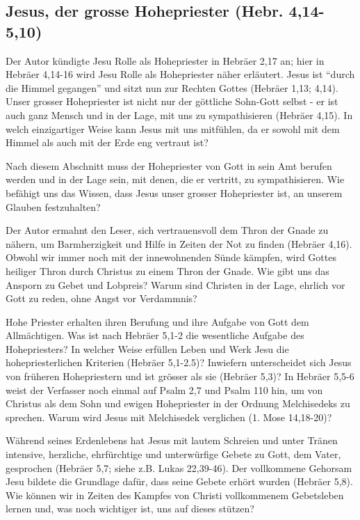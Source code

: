 \documentclass[
  12pt,
]{krantz}
\begin{document}
\hypertarget{jesus-der-grosse-hohepriester-hebr.-414-510}{%
\subsection{Jesus, der grosse Hohepriester (Hebr. 4,14-5,10)}\label{jesus-der-grosse-hohepriester-hebr.-414-510}}

Der Autor kündigte Jesu Rolle als Hohepriester in Hebräer 2,17 an; hier in Hebräer 4,14-16 wird Jesu Rolle als Hohepriester näher erläutert. Jesus ist ``durch die Himmel gegangen'' und sitzt nun zur Rechten Gottes (Hebräer 1,13; 4,14). Unser grosser Hohepriester ist nicht nur der göttliche Sohn-Gott selbst - er ist auch ganz Mensch und in der Lage, mit uns zu sympathisieren (Hebräer 4,15). In welch einzigartiger Weise kann Jesus mit uns mitfühlen, da er sowohl mit dem Himmel als auch mit der Erde eng vertraut ist?

Nach diesem Abschnitt muss der Hohepriester von Gott in sein Amt berufen werden und in der Lage sein, mit denen, die er vertritt, zu sympathisieren. Wie befähigt uns das Wissen, dass Jesus unser grosser Hohepriester ist, an unserem Glauben festzuhalten?

Der Autor ermahnt den Leser, sich vertrauensvoll dem Thron der Gnade zu nähern, um Barmherzigkeit und Hilfe in Zeiten der Not zu finden (Hebräer 4,16). Obwohl wir immer noch mit der innewohnenden Sünde kämpfen, wird Gottes heiliger Thron durch Christus zu einem Thron der Gnade. Wie gibt uns das Ansporn zu Gebet und Lobpreis? Warum sind Christen in der Lage, ehrlich vor Gott zu reden, ohne Angst vor Verdammnis?

Hohe Priester erhalten ihren Berufung und ihre Aufgabe von Gott dem Allmächtigen. Was ist nach Hebräer 5,1-2 die wesentliche Aufgabe des Hohepriesters? In welcher Weise erfüllen Leben und Werk Jesu die hohepriesterlichen Kriterien (Hebräer 5,1-2.5)? Inwiefern unterscheidet sich Jesus von früheren Hohepriestern und ist grösser als sie (Hebräer 5,3)?
In Hebräer 5,5-6 weist der Verfasser noch einmal auf Psalm 2,7 und Psalm 110 hin, um von Christus als dem Sohn und ewigen Hohepriester in der Ordnung Melchisedeks zu sprechen. Warum wird Jesus mit Melchisedek verglichen (1. Mose 14,18-20)?

Während seines Erdenlebens hat Jesus mit lautem Schreien und unter Tränen intensive, herzliche, ehrfürchtige und unterwürfige Gebete zu Gott, dem Vater, gesprochen (Hebräer 5,7; siehe z.B. Lukas 22,39-46). Der vollkommene Gehorsam Jesu bildete die Grundlage dafür, dass seine Gebete erhört wurden (Hebräer 5,8). Wie können wir in Zeiten des Kampfes von Christi vollkommenem Gebetsleben lernen und, was noch wichtiger ist, uns auf dieses stützen?
\end{document}
